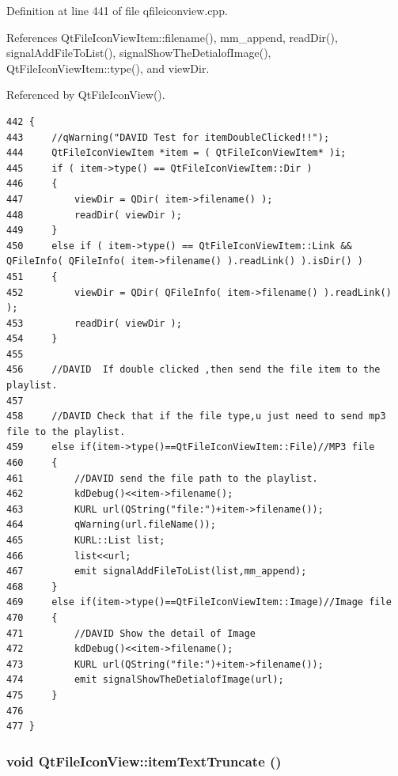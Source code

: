 Definition at line 441 of file qfileiconview.cpp.

References Qt\-File\-Icon\-View\-Item::filename(), mm\_\-append, read\-Dir(), signal\-Add\-File\-To\-List(), signal\-Show\-The\-Detialof\-Image(), Qt\-File\-Icon\-View\-Item::type(), and view\-Dir.

Referenced by Qt\-File\-Icon\-View().



\footnotesize\begin{verbatim}442 {
443     //qWarning("DAVID Test for itemDoubleClicked!!");
444     QtFileIconViewItem *item = ( QtFileIconViewItem* )i;
445     if ( item->type() == QtFileIconViewItem::Dir ) 
446     {
447         viewDir = QDir( item->filename() );
448         readDir( viewDir );
449     } 
450     else if ( item->type() == QtFileIconViewItem::Link && QFileInfo( QFileInfo( item->filename() ).readLink() ).isDir() ) 
451     {
452         viewDir = QDir( QFileInfo( item->filename() ).readLink() );
453         readDir( viewDir );
454     }
455     
456     //DAVID  If double clicked ,then send the file item to the playlist.
457     
458     //DAVID Check that if the file type,u just need to send mp3 file to the playlist.
459     else if(item->type()==QtFileIconViewItem::File)//MP3 file
460     {
461         //DAVID send the file path to the playlist.
462         kdDebug()<<item->filename();
463         KURL url(QString("file:")+item->filename());
464         qWarning(url.fileName());
465         KURL::List list;
466         list<<url;
467         emit signalAddFileToList(list,mm_append);
468     }
469     else if(item->type()==QtFileIconViewItem::Image)//Image file
470     {
471         //DAVID Show the detail of Image
472         kdDebug()<<item->filename();
473         KURL url(QString("file:")+item->filename());
474         emit signalShowTheDetialofImage(url);
475     }
476     
477 }
\end{verbatim}\normalsize 
{}
\subsubsection{\setlength{\rightskip}{0pt plus 5cm}void Qt\-File\-Icon\-View::item\-Text\-Truncate ()\hspace{0.3cm}{\tt  [protected, slot]}}\label{classQtFileIconView_QtFileIconViewj9}





